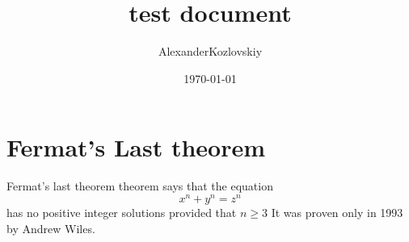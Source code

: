\documentclass{article}
\title{test document}
\author{AlexanderKozlovskiy}
\date{\today}
\begin{document}
\maketitle{}
\section{Fermat's Last theorem}

Fermat's last theorem theorem says that the equation 
\[ 
x^n+y^n=z^n 
\] has no positive integer solutions provided that \( n\ge 3 \) It was proven only in 1993 by Andrew Wiles.
\end{document}
